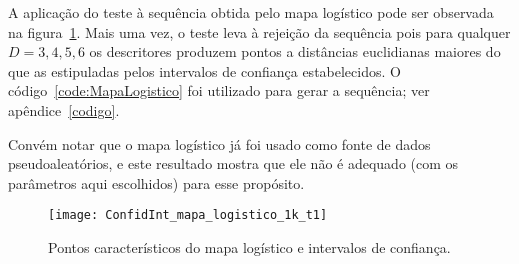 A aplicação do teste à sequência obtida pelo
mapa logístico pode ser observada na figura~\ref{Fig:ConfidInt_mapa_logistico_1k_t1}.
Mais uma vez, o teste leva à rejeição da sequência pois para qualquer $D= 3, 4, 5, 6$ os descritores produzem pontos a distâncias euclidianas maiores do que as estipuladas pelos intervalos de confiança estabelecidos. 
O código~\ref{code:MapaLogistico} foi utilizado para gerar a sequência; ver apêndice~\ref{codigo}.

Convém notar que o mapa logístico já foi usado como fonte de dados pseudoaleatórios, e este resultado mostra que ele não é adequado (com os parâmetros aqui escolhidos) para esse propósito.

\begin{figure}
	\centering
	\texttt{[image: ConfidInt\_mapa\_logistico\_1k\_t1]}
	\caption{Pontos característicos do mapa logístico e intervalos de confiança.}\label{Fig:ConfidInt_mapa_logistico_1k_t1}
\end{figure}

